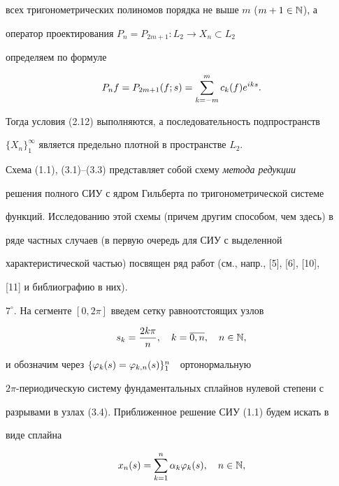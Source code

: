 всех тригонометрических полиномов порядка не выше $m$ ($m+1\in \Bbb N$), а


оператор проектирования $P_n = P_{2m+1}:L_2\to X_n\subset L_2$


определяем по формуле


\begin{equation}


P_nf = P_{2m+1}(f;s) = \suml_{k=-m}^m c_k(f)e^{iks}.


\end{equation}


Тогда условия (2.12) выполняются, а последовательность подпространств


$\{X_n\}_1^\infty$ является предельно плотной в пространстве $L_2$.





Схема (1.1), (3.1)--(3.3) представляет собой схему {\it метода редукции}


решения полного СИУ с ядром Гильберта по тригонометрической системе


функций. Исследованию этой схемы (причем другим способом, чем здесь) в


ряде частных случаев (в первую очередь для СИУ с выделенной


характеристической частью) посвящен ряд работ (см., напр., [5], [6], [10],


[11] и библиографию в них).





$7^\circ$. На сегменте $[0,2\pi]$ введем сетку равноотстоящих узлов


\begin{equation}


s_k = \frac{2k\pi}{n},\quad k=\ol{0,n},\quad n\in \N,


\end{equation}


и обозначим через $\{\varphi_k(s) = \varphi_{k,n}(s)\}_1^n$\ \ ортонормальную


$2\pi$-периодическую систему фундаментальных сплайнов нулевой степени с


разрывами в узлах (3.4). Приближенное решение СИУ (1.1) будем искать в


виде сплайна


\begin{equation}


x_n(s) = \suml_{k=1}^n \alpha_k \vp_k(s),\quad n\in \N,


\end{equation}


